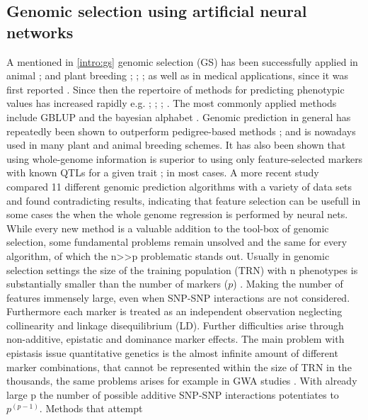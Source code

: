 \subsection{Genomic selection using artificial neural networks }
A mentioned in \ref{intro:gs} genomic selection (GS) has been successfully applied in animal
\cite{gianola2015one}; \cite{hayes2010genome} and plant breeding \cite{crossa2010}; \cite{desta2014genomic};
\cite{heffner2010plant}; \cite{crossa2017} as well as in medical applications, since it was first reported
\cite{hayes2001}. Since then the repertoire of methods for predicting phenotypic values has increased rapidly
e.g. \cite{dlc2009}; \cite{habier2011}; \cite{gianola2013}; \cite{crossa2017}. The most commonly applied
methods include GBLUP and the bayesian alphabet \cite{gianola2009}. Genomic prediction in general has
repeatedly been shown to outperform pedigree-based methods \cite{crossa2010}; \cite{albrecht2011} and is
nowadays used in many plant and animal breeding schemes. It has also been shown that using whole-genome
information is superior to using only feature-selected markers with known QTLs for a given trait
\cite{bernardo2007}; \cite{heffner2011} in most cases. A more recent study \cite{azodi2019} compared 11
different genomic prediction algorithms with a variety of data sets and found contradicting results,
indicating that feature selection can be usefull in some cases the when the whole genome regression is
performed by neural nets. \\
While every new method is a valuable addition to the tool-box of genomic selection, some fundamental problems
remain unsolved and the same for every algorithm, of which the n>>p problematic stands out. Usually in genomic
selection settings the size of the training population (TRN) with n phenotypes is substantially smaller than
the number of markers ($p$) \cite{fan2014challenges}. Making the number of features immensely large, even when
SNP-SNP interactions are not considered. Furthermore each marker is treated as an independent observation
neglecting collinearity and linkage disequilibrium (LD). Further difficulties arise through non-additive,
epistatic and dominance marker effects. The main problem with epistasis issue quantitative genetics is the
almost infinite amount of different marker combinations, that cannot be represented within the size of TRN in
the thousands, the same problems arises for example in GWA studies \cite{korte2013advantages}. With already
large p the number of possible additive SNP-SNP interactions potentiates to $p^{(p-1)}$. Methods that attempt
